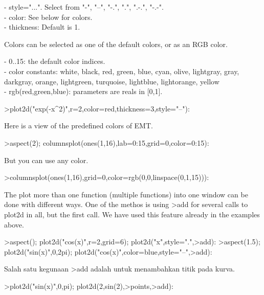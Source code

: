 \documentclass[a4paper,10pt]{article}
\begin{document}
\begin{eulernotebook}
\begin{eulercomment}
\begin{eulercomment}
\begin{eulercomment}
\begin{eulercomment}
\begin{eulercomment}
- style="...". Select from "-", "--", "-.", ".", ".-.", "-.-".\\
- color: See below for colors.\\
- thickness: Default is 1.

Colors can be selected as one of the default colors, or as an RGB
color.

- 0..15: the default color indices.\\
- color constants: white, black, red, green, blue, cyan, olive,
lightgray, gray, darkgray, orange, lightgreen, turquoise, lightblue,
lightorange, yellow\\
- rgb(red,green,blue): parameters are reals in [0,1].
\end{eulercomment}
\begin{eulerprompt}
>plot2d("exp(-x^2)",r=2,color=red,thickness=3,style="--"):
\end{eulerprompt}
\begin{eulercomment}
Here is a view of the predefined colors of EMT.
\end{eulercomment}
\begin{eulerprompt}
>aspect(2); columnsplot(ones(1,16),lab=0:15,grid=0,color=0:15):
\end{eulerprompt}
\begin{eulercomment}
But you can use any color.
\end{eulercomment}
\begin{eulerprompt}
>columnsplot(ones(1,16),grid=0,color=rgb(0,0,linspace(0,1,15))):
\end{eulerprompt}
\begin{eulercomment}
The plot more than one function (multiple functions) into one window can be done with
different ways. One of the methos is using \textgreater{}add for several calls to plot2d in all, but
the first call. We have used this feature already in the examples above.
\end{eulercomment}
\begin{eulerprompt}
>aspect(); plot2d("cos(x)",r=2,grid=6); plot2d("x",style=".",>add):
>aspect(1.5); plot2d("sin(x)",0,2pi); plot2d("cos(x)",color=blue,style="--",>add):
\end{eulerprompt}
\begin{eulercomment}
Salah satu kegunaan \textgreater{}add adalah untuk menambahkan titik pada kurva.
\end{eulercomment}
\begin{eulerprompt}
>plot2d("sin(x)",0,pi); plot2d(2,sin(2),>points,>add):

\end{eulerprompt}
\end{eulercomment}
\end{eulercomment}
\end{eulercomment}
\end{eulercomment}
\end{eulernotebook}
\end{document}
